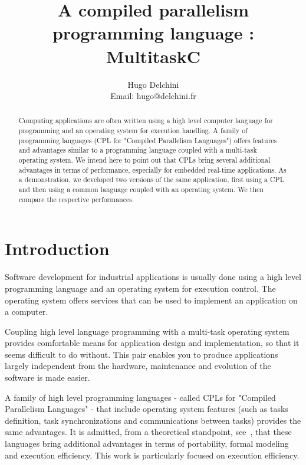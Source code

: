 \documentclass[10pt]{report}
\begin{document}
\title{A compiled parallelism programming language : MultitaskC}

\author{
Hugo Delchini\\
Email: hugo@delchini.fr\\
}

\maketitle
\thispagestyle{empty}

\begin{abstract}

Computing applications are often written using a high level 
computer language for programming and an operating system for 
execution handling. A family of programming languages (CPL for 
"Compiled Parallelism Languages") offers features and advantages 
similar to a programming language coupled with a multi-task 
operating system. We intend here to point out that CPLs bring 
several additional advantages in terms of performance, especially 
for embedded real-time applications. As a demonstration, we 
developed two versions of the same application, first using a CPL 
and then using a common language coupled with an operating 
system. We then compare the respective performances.

\end{abstract}

\tableofcontents

\chapter{Introduction}
\label{sec:intro}

Software development for industrial applications is usually done 
using a high level programming language and an operating system 
for execution control. The operating system offers services that 
can be used to implement an application on a computer.

Coupling high level language programming with a multi-task 
operating system provides comfortable means for application 
design and implementation, so that it seems difficult to do 
without. This pair enables you to produce applications largely 
independent from the hardware, maintenance and evolution of the 
software is made easier.

A family of high level programming languages - called CPLs for 
"Compiled Parallelism Languages" - that include operating system 
features (such as tasks definition, task synchronizations and 
communications between tasks) provides the same advantages. It is 
admitted, from a theoretical standpoint, see~\cite{Halbwachs:91}, that 
these languages bring additional advantages in terms of 
portability, formal modeling and execution efficiency. This work 
is particularly focused on execution efficiency.
\end{document}
